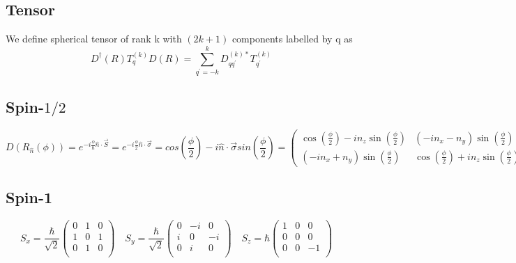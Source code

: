 \subsection{Tensor}
We define spherical tensor of rank k with $(2k+1)$ components labelled by q
as
\begin{equation}
    D^{\dag}(R)T^{(k)}_{q}D(R)=\displaystyle\sum_{q^\prime=-k}^{k}D^{(k)*}_{qq^\prime}T^{(k)}_{q^\prime}
\end{equation}
\subsection{Spin-$1/2$} 
\[ 
D(R_{\hat{n}}(\phi)) = e^{-i\frac{\phi}{\hbar}\hat{n}\cdot\vec{S}} = e^{-i\frac{\phi}{2}\hat{n}\cdot\vec{\sigma}} = 
cos(\frac{\phi}{2}) - i \hat{n} \cdot \vec{\sigma} sin(\frac{\phi}{2}) = 
\begin{pmatrix}
    \cos(\frac{\phi}{2}) - in_{z}\sin(\frac{\phi}{2}) & (-i n_{x} - n_{y})\sin(\frac{\phi}{2}) \\ 
    (-i n_{x} + n_{y})\sin(\frac{\phi}{2}) &  \cos(\frac{\phi}{2}) + in_{z}\sin(\frac{\phi}{2})  
\end{pmatrix}
\]

\subsection{Spin-1}
\begin{equation}
    S_x=\frac{\hbar}{\sqrt{2}}
    \begin{pmatrix}
	0   & 1	& 0 \\
	1   & 0	& 1 \\
	0   & 1	& 0 \\
    \end{pmatrix}\quad
    S_y=\frac{\hbar}{\sqrt{2}}
    \begin{pmatrix}
	0   & -i    & 0 \\
	i   & 0	& -i \\
	0   & i	& 0 \\
    \end{pmatrix}\quad
    S_z=\hbar
    \begin{pmatrix}
	1   & 0	& 0 \\
	0   & 0	& 0 \\
	0   & 0	& -1 \\
    \end{pmatrix}\quad
\end{equation}

